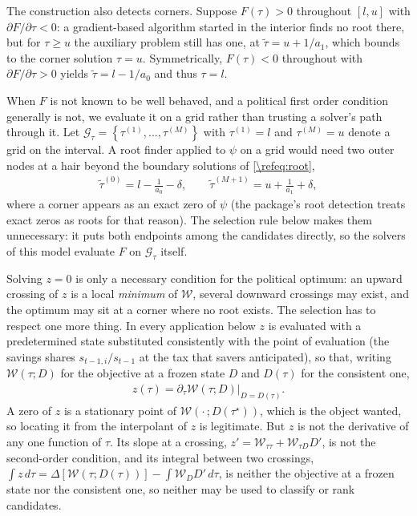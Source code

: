 The construction also detects corners. Suppose $F(\tau)>0$ throughout $[l,u]$ with $\partial F/\partial\tau <0$: a gradient-based algorithm started in the interior finds no root there, but for $\tau\geq u$ the auxiliary problem still has one, at $\tilde{\tau} = u+1/a_1$, which bounds to the corner solution $\tau = u$. Symmetrically, $F(\tau)<0$ throughout with $\partial F/\partial \tau>0$ yields $\tilde{\tau} = l-1/a_0$ and thus $\tau = l$.

When $F$ is not known to be well behaved, and a political first order condition generally is not, we evaluate it on a grid rather than trusting a solver's path through it. Let $\mathcal{G}_{\tau} = \left\lbrace \tau^{(1)},...,\tau^{(M)}\right\rbrace$ with $\tau^{(1)} = l$ and $\tau^{(M)} = u$ denote a grid on the interval. A root finder applied to $\psi$ on a grid would need two outer nodes at a hair beyond the boundary solutions of \eqref{\refeq:root},
\begin{align}\label{\refeq:extendedGrid}
    \tilde{\tau}^{(0)} = l-\frac{1}{a_0}-\delta, \qquad \tilde{\tau}^{(M+1)} = u+\frac{1}{a_1}+\delta,
\end{align}
where a corner appears as an exact zero of $\psi$ (the package's root detection treats exact zeros as roots for that reason). The selection rule below makes them unnecessary: it puts both endpoints among the candidates directly, so the solvers of this model evaluate $F$ on $\mathcal{G}_{\tau}$ itself.

Solving $z = 0$ is only a necessary condition for the political optimum: an upward crossing of $z$ is a local \emph{minimum} of $\mathcal{W}$, several downward crossings may exist, and the optimum may sit at a corner where no root exists. The selection has to respect one more thing. In every application below $z$ is evaluated with a predetermined state substituted consistently with the point of evaluation (the savings shares $s_{t-1,i}/s_{t-1}$ at the tax that savers anticipated), so that, writing $\mathcal{W}(\tau; D)$ for the objective at a frozen state $D$ and $D(\tau)$ for the consistent one,
\begin{align}\label{\refeq:consistentFOC}
    z(\tau) = \partial_{\tau}\mathcal{W}\left(\tau; D\right)\big|_{D = D(\tau)}.
\end{align}
A zero of $z$ is a stationary point of $\mathcal{W}(\cdot\,; D(\tau^{\star}))$, which is the object wanted, so locating it from the interpolant of $z$ is legitimate. But $z$ is not the derivative of any one function of $\tau$. Its slope at a crossing, $z' = \mathcal{W}_{\tau\tau} + \mathcal{W}_{\tau D}D'$, is not the second-order condition, and its integral between two crossings, $\int z\,d\tau = \Delta\left[\mathcal{W}(\tau;D(\tau))\right] - \int \mathcal{W}_D D'\,d\tau$, is neither the objective at a frozen state nor the consistent one, so neither may be used to classify or rank candidates.


